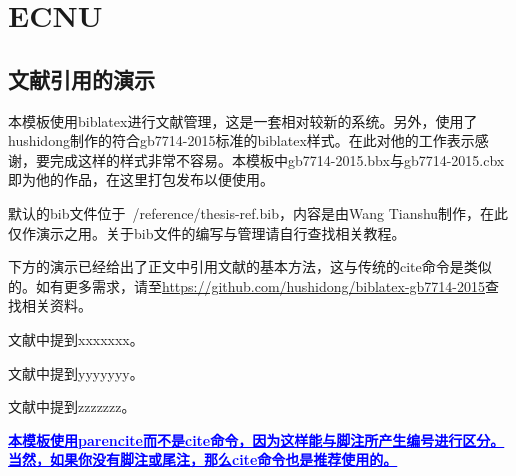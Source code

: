 \documentclass[twoside]{article}
\begin{document}
    \section*{ECNU}

\subsection{文献引用的演示}
\par 本模板使用biblatex进行文献管理，这是一套相对较新的系统。另外，使用了hushidong制作的符合gb7714-2015标准的biblatex样式。在此对他的工作表示感谢，要完成这样的样式非常不容易。本模板中gb7714-2015.bbx与gb7714-2015.cbx即为他的作品，在这里打包发布以便使用。
\par 默认的bib文件位于~/reference/thesis-ref.bib，内容是由Wang Tianshu制作，在此仅作演示之用。关于bib文件的编写与管理请自行查找相关教程。
\par 下方的演示已经给出了正文中引用文献的基本方法，这与传统的cite命令是类似的。如有更多需求，请至\url{https://github.com/hushidong/biblatex-gb7714-2015}查找相关资料。
\par 文献\parencite{Yang_Hy200215}中提到xxxxxxx。
\par 文献\parencite{Joa1999}中提到yyyyyyy。
\par 文献\parencite{Altman1997}中提到zzzzzzz。
\par \textcolor{blue}{\textbf{\uline{本模板使用parencite而不是cite命令，因为这样能与脚注所产生编号进行区分。当然，如果你没有脚注或尾注，那么cite命令也是推荐使用的。}}}

\printbibliography

    
\end{document}

